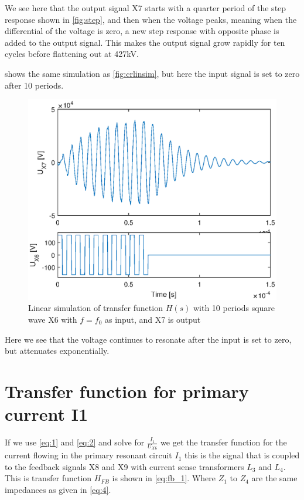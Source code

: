 We see here that the output signal X7 starts with a quarter period of the step response shown in \cref{fig:step}, and then when the voltage peaks, meaning when the differential of the voltage is zero, a new step response with opposite phase is added to the output signal. This makes the output signal grow rapidly for ten cycles before flattening out at 427kV.

 shows the same simulation as \cref{fig:crlinsim}, but here the input signal is set to zero after 10 periods.

\begin{figure}[H]
    \centering
    \includegraphics[width=\textwidth]{img/Linsim_10T.eps}
    \caption{Linear simulation of transfer function $H(s)$ with 10 periods square wave X6 with $f=f_0$ as input, and X7 is output}
    \label{fig:crlinsim10T}
\end{figure}

Here we see that the voltage continues to resonate after the input is set to zero, but attenuates exponentially.

\newpage
\section{Transfer function for primary current I1}
\label{sec:mod_fb}
If we use \cref{eq:1} and \cref{eq:2} and solve for $\frac{I_1}{U_{X6}}$ we get the transfer function for the current flowing in the primary resonant circuit $I_1$ this is the signal that is coupled to the feedback signals X8 and X9 with current sense transformers $L_3$ and $L_4$. This is transfer function $H_{FB}$ is shown in \cref{eq:fb_1}. Where $Z_1$ to $Z_4$ are the same impedances as given in \cref{eq:4}.

